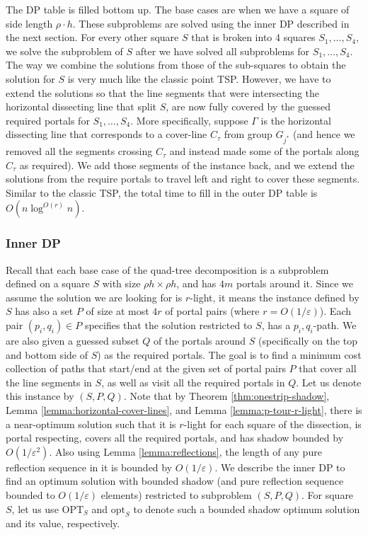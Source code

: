 \documentclass[pdflatex,sn-mathphys-num]{sn-jnl}
\theoremstyle{thmstyleone}
\newcommand{\eps}{\varepsilon}
\newcommand{\opt}{{\text{opt}}}
\newcommand{\OPT}{{\text{OPT}}}
\begin{document}
The DP table is filled bottom up. The base cases are when we have a square of side length $\rho\cdot h$.
These subproblems are solved using the inner DP described in the next section.
For every other square $S$ that is broken into 4 squares $S_1,\ldots,S_4$, we solve the subproblem of $S$
after we have solved all subproblems for $S_1,\ldots,S_4$.
The way we combine the solutions from those of the sub-squares to obtain the solution for $S$ is very much like
the classic point TSP. However, we have to extend the solutions so that the line segments that were intersecting the horizontal dissecting line that split $S$, are now fully covered by the guessed required portals for $S_1,\ldots,S_4$.
More specifically, suppose $\Gamma$ is the horizontal dissecting line that corresponds to a cover-line $C_\tau$ from group $G_{j^*}$ (and hence we removed all the segments crossing $C_\tau$ and instead made some of the portals along $C_\tau$ as required). We add those segments of the instance back, and we extend the solutions from the require portals to travel left and right to cover these segments.
Similar to the classic TSP, the total time to fill in the outer DP table is $O(n \log^{O(r)} n)$.

\subsubsection{Inner DP}\label{sec:inner-dp}
Recall that each base case of the quad-tree decomposition is a subproblem defined 
on a square $S$ with size $\rho h \times \rho h$, and has $4m$ portals around it.
Since we assume the solution we are looking for is $r$-light, it means the instance defined by $S$ has also
a set $P$ of size at most $4r$ of portal pairs (where $r=O(1/\eps)$). Each pair $(p_i,q_i)\in P$ specifies that the solution restricted to $S$, has a $p_i,q_i$-path. We are also given a guessed subset $Q$ of the portals around $S$ (specifically  on the top and bottom side of $S$) as the required portals. The goal is to find a minimum cost collection of paths that start/end at the given set of portal pairs $P$ that cover all the line segments in $S$, as well as visit all the required portals in $Q$. Let us denote this instance by $(S,P,Q)$. Note
that by Theorem \ref{thm:onestrip-shadow}, Lemma \ref{lemma:horizontal-cover-lines}, and Lemma \ref{lemma:p-tour-r-light}, there is a near-optimum solution such that it is $r$-light for each square of the dissection, is portal respecting, covers all the required portals, and has shadow bounded by $O(1/\eps^2)$. Also using Lemma \ref{lemma:reflections}, the length
of any pure reflection sequence in it is bounded by $O(1/\eps)$. We describe the inner DP to find 
an optimum solution with bounded shadow (and pure reflection sequence bounded to $O(1/\eps)$ elements) restricted
to subproblem $(S,P,Q)$. For square $ S $, let us use $\OPT_S$ and $\opt_S$ to denote such a bounded shadow optimum solution and its value, respectively.
\end{document}
